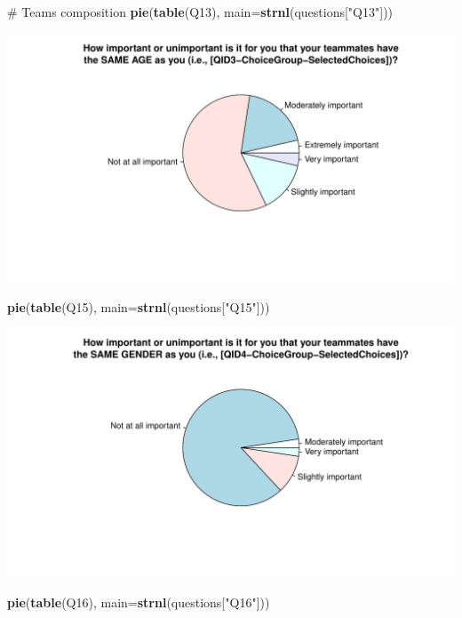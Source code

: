 \documentclass[12pt, titlepage]{article}
\newenvironment{Shaded}{\begin{snugshade}}{\end{snugshade}}
\newcommand{\KeywordTok}[1]{\textcolor[rgb]{0.12,0.11,0.11}{\textbf{#1}}}
\newcommand{\DataTypeTok}[1]{\textcolor[rgb]{0.00,0.34,0.68}{#1}}
\newcommand{\StringTok}[1]{\textcolor[rgb]{0.75,0.01,0.01}{#1}}
\newcommand{\CommentTok}[1]{\textcolor[rgb]{0.54,0.53,0.53}{#1}}
\newcommand{\NormalTok}[1]{\textcolor[rgb]{0.12,0.11,0.11}{#1}}
\begin{document}
\begin{Shaded}
\begin{Highlighting}[]
\CommentTok{# Teams composition}
\KeywordTok{pie}\NormalTok{(}\KeywordTok{table}\NormalTok{(Q13), }\DataTypeTok{main=}\KeywordTok{strnl}\NormalTok{(questions[}\StringTok{"Q13"}\NormalTok{]))}
\end{Highlighting}
\end{Shaded}

\includegraphics{analysis_survey_files/figure-latex/unnamed-chunk-2-10.pdf}

\begin{Shaded}
\begin{Highlighting}[]
\KeywordTok{pie}\NormalTok{(}\KeywordTok{table}\NormalTok{(Q15), }\DataTypeTok{main=}\KeywordTok{strnl}\NormalTok{(questions[}\StringTok{"Q15"}\NormalTok{]))}
\end{Highlighting}
\end{Shaded}

\includegraphics{analysis_survey_files/figure-latex/unnamed-chunk-2-11.pdf}

\begin{Shaded}
\begin{Highlighting}[]
\KeywordTok{pie}\NormalTok{(}\KeywordTok{table}\NormalTok{(Q16), }\DataTypeTok{main=}\KeywordTok{strnl}\NormalTok{(questions[}\StringTok{"Q16"}\NormalTok{]))}
\end{Highlighting}
\end{Shaded}
\end{document}
